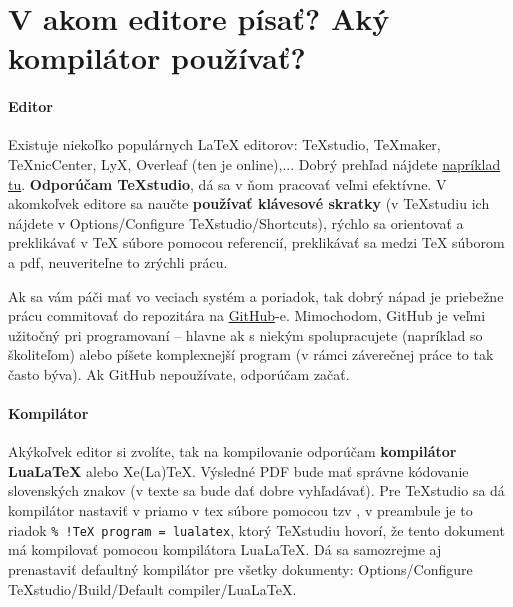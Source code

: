 \chapter{V akom editore písať? Aký kompilátor používať?}\label{sec:aky_editor}

\subsubsection{Editor}
Existuje niekoľko populárnych LaTeX editorov: TeXstudio, TeXmaker, TeXnicCenter, LyX, Overleaf (ten je online),... Dobrý prehľad nájdete \href{https://beebom.com/best-latex-editors/}{napríklad tu}. \textbf{Odporúčam TeXstudio}, dá sa v ňom pracovať veľmi efektívne. V akomkoľvek editore sa naučte \textbf{používať klávesové skratky} (v TeXstudiu ich nájdete v Options/Configure TeXstudio/Shortcuts), rýchlo sa orientovať a preklikávať v TeX súbore pomocou referencií, preklikávať sa medzi TeX súborom a pdf, neuveriteľne to zrýchli prácu.

Ak sa vám páči mať vo veciach systém a poriadok, tak dobrý nápad je priebežne prácu commitovať do repozitára na \href{https://github.com/}{GitHub}-e. Mimochodom, GitHub je veľmi užitočný pri programovaní -- hlavne ak s niekým spolupracujete (napríklad so školiteľom) alebo píšete komplexnejší program (v rámci záverečnej práce to tak často býva). Ak GitHub nepoužívate, odporúčam začať.

\subsubsection{Kompilátor}
Akýkoľvek editor si zvolíte, tak na kompilovanie odporúčam \textbf{kompilátor LuaLaTeX} alebo Xe(La)TeX. Výsledné PDF bude mať správne kódovanie slovenských znakov (v texte sa bude dať dobre vyhľadávať). Pre TeXstudio sa dá kompilátor nastaviť v priamo v tex súbore pomocou tzv , v preambule je to riadok \verb|% !TeX program = lualatex|, ktorý TeXstudiu hovorí, že tento dokument má kompilovať pomocou kompilátora LuaLaTeX. Dá sa samozrejme aj prenastaviť defaultný kompilátor pre všetky dokumenty: Options/Configure TeXstudio/Build/Default compiler/LuaLaTeX.
